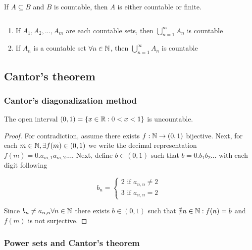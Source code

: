 \begin{theorem}
    If $A \subseteq B$ and $B$ is countable, then $A$ is either countable or finite.
\end{theorem}

\begin{theorem}
    $ $ \newline
    \begin{enumerate}
        \item If $A_1, A_2, ..., A_m$ are each countable sets, then $\bigcup \limits_{n=1}^m A_n$ is countable
        \item If $A_n$ is a countable set $\forall n \in \mathbb{N}$, then $\bigcup \limits_{n=1}^\infty A_n$ is countable
    \end{enumerate}
\end{theorem}

\subsection{Cantor's theorem}

\subsubsection{Cantor's diagonalization method}

\begin{theorem}
    The open interval $(0,1) = \{ x \in \mathbb{R}: 0 < x < 1 \}$ is uncountable.    
\end{theorem}

\begin{proof}
    For contradiction, assume there exists $f: \mathbb{N} \to (0,1)$ bijective. Next, for each $m \in \mathbb{N}, \exists f(m) \in (0,1)$ we write the decimal representation $f(m) = 0.a_{m,1}a_{m,2}...$. Next, define $b \in (0,1)$ such that $b = 0.b_1b_2...$ with each digit following

    \begin{equation}
        b_n = \begin{cases}
            2 \text{ if } a_{n,n} \ne 2 \\
            3 \text{ if } a_{n,n} = 2
        \end{cases}
    \end{equation}

    Since $b_n \neq a_{n,n} \forall n \in \mathbb{N}$ there exists $b \in (0,1)$ such that $\nexists n \in \mathbb{N}: f(n) = b$ and $f(m)$ is not surjective.
\end{proof}

\subsubsection{Power sets and Cantor's theorem}

